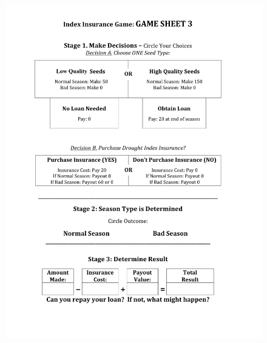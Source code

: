 \documentclass[letterpaper,10pt,english]{sphinxmanual}
\begin{document}
\begin{figure}[htbp]
\centering

\includegraphics{indexinsurancegame3_en1.png}
\end{figure}
\end{document}
